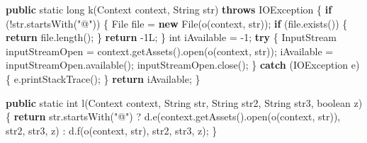 \documentclass[
]{article}
\newenvironment{Shaded}{}{}
\newcommand{\BuiltInTok}[1]{\textcolor[rgb]{0.00,0.50,0.00}{#1}}
\newcommand{\ControlFlowTok}[1]{\textcolor[rgb]{0.00,0.44,0.13}{\textbf{#1}}}
\newcommand{\DataTypeTok}[1]{\textcolor[rgb]{0.56,0.13,0.00}{#1}}
\newcommand{\DecValTok}[1]{\textcolor[rgb]{0.25,0.63,0.44}{#1}}
\newcommand{\FunctionTok}[1]{\textcolor[rgb]{0.02,0.16,0.49}{#1}}
\newcommand{\KeywordTok}[1]{\textcolor[rgb]{0.00,0.44,0.13}{\textbf{#1}}}
\newcommand{\NormalTok}[1]{#1}
\newcommand{\OperatorTok}[1]{\textcolor[rgb]{0.40,0.40,0.40}{#1}}
\newcommand{\StringTok}[1]{\textcolor[rgb]{0.25,0.44,0.63}{#1}}
\begin{document}
\begin{Shaded}
\begin{Highlighting}[]
    \KeywordTok{public} \DataTypeTok{static} \DataTypeTok{long} \FunctionTok{k}\OperatorTok{(}\BuiltInTok{Context}\NormalTok{ context}\OperatorTok{,} \BuiltInTok{String}\NormalTok{ str}\OperatorTok{)} \KeywordTok{throws} \BuiltInTok{IOException} \OperatorTok{\{}
        \ControlFlowTok{if} \OperatorTok{(!}\NormalTok{str}\OperatorTok{.}\FunctionTok{startsWith}\OperatorTok{(}\StringTok{"@"}\OperatorTok{))} \OperatorTok{\{}
            \BuiltInTok{File}\NormalTok{ file }\OperatorTok{=} \KeywordTok{new} \BuiltInTok{File}\OperatorTok{(}\FunctionTok{o}\OperatorTok{(}\NormalTok{context}\OperatorTok{,}\NormalTok{ str}\OperatorTok{));}
            \ControlFlowTok{if} \OperatorTok{(}\NormalTok{file}\OperatorTok{.}\FunctionTok{exists}\OperatorTok{())} \OperatorTok{\{}
                \ControlFlowTok{return}\NormalTok{ file}\OperatorTok{.}\FunctionTok{length}\OperatorTok{();}
            \OperatorTok{\}}
            \ControlFlowTok{return} \OperatorTok{{-}}\DecValTok{1L}\OperatorTok{;}
        \OperatorTok{\}}
        \DataTypeTok{int}\NormalTok{ iAvailable }\OperatorTok{=} \OperatorTok{{-}}\DecValTok{1}\OperatorTok{;}
        \ControlFlowTok{try} \OperatorTok{\{}
            \BuiltInTok{InputStream}\NormalTok{ inputStreamOpen }\OperatorTok{=}\NormalTok{ context}\OperatorTok{.}\FunctionTok{getAssets}\OperatorTok{().}\FunctionTok{open}\OperatorTok{(}\FunctionTok{o}\OperatorTok{(}\NormalTok{context}\OperatorTok{,}\NormalTok{ str}\OperatorTok{));}
\NormalTok{            iAvailable }\OperatorTok{=}\NormalTok{ inputStreamOpen}\OperatorTok{.}\FunctionTok{available}\OperatorTok{();}
\NormalTok{            inputStreamOpen}\OperatorTok{.}\FunctionTok{close}\OperatorTok{();}
        \OperatorTok{\}} \ControlFlowTok{catch} \OperatorTok{(}\BuiltInTok{IOException}\NormalTok{ e}\OperatorTok{)} \OperatorTok{\{}
\NormalTok{            e}\OperatorTok{.}\FunctionTok{printStackTrace}\OperatorTok{();}
        \OperatorTok{\}}
        \ControlFlowTok{return}\NormalTok{ iAvailable}\OperatorTok{;}
    \OperatorTok{\}}

    \KeywordTok{public} \DataTypeTok{static} \DataTypeTok{int} \FunctionTok{l}\OperatorTok{(}\BuiltInTok{Context}\NormalTok{ context}\OperatorTok{,} \BuiltInTok{String}\NormalTok{ str}\OperatorTok{,} \BuiltInTok{String}\NormalTok{ str2}\OperatorTok{,} \BuiltInTok{String}\NormalTok{ str3}\OperatorTok{,} \DataTypeTok{boolean}\NormalTok{ z}\OperatorTok{)} \OperatorTok{\{}
        \ControlFlowTok{return}\NormalTok{ str}\OperatorTok{.}\FunctionTok{startsWith}\OperatorTok{(}\StringTok{"@"}\OperatorTok{)} \OperatorTok{?}\NormalTok{ d}\OperatorTok{.}\FunctionTok{e}\OperatorTok{(}\NormalTok{context}\OperatorTok{.}\FunctionTok{getAssets}\OperatorTok{().}\FunctionTok{open}\OperatorTok{(}\FunctionTok{o}\OperatorTok{(}\NormalTok{context}\OperatorTok{,}\NormalTok{ str}\OperatorTok{)),}\NormalTok{ str2}\OperatorTok{,}\NormalTok{ str3}\OperatorTok{,}\NormalTok{ z}\OperatorTok{)} \OperatorTok{:}\NormalTok{ d}\OperatorTok{.}\FunctionTok{f}\OperatorTok{(}\FunctionTok{o}\OperatorTok{(}\NormalTok{context}\OperatorTok{,}\NormalTok{ str}\OperatorTok{),}\NormalTok{ str2}\OperatorTok{,}\NormalTok{ str3}\OperatorTok{,}\NormalTok{ z}\OperatorTok{);}
    \OperatorTok{\}}


\end{Highlighting}
\end{Shaded}
\end{document}

